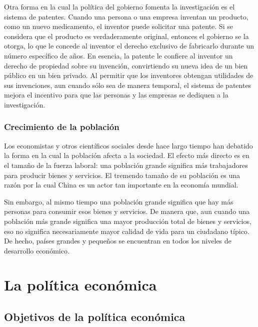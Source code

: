 \documentclass[
]{krantz}
\begin{document}
Otra forma en la cual la política del gobierno fomenta la investigación es el sistema de patentes. Cuando una persona o una empresa inventan un producto, como un nuevo medicamento, el inventor puede solicitar una patente. Si se considera que el producto es verdaderamente original, entonces el gobierno se la otorga, lo que le concede al inventor el derecho exclusivo de fabricarlo durante un número específico de años. En esencia, la patente le confiere al inventor un derecho de propiedad sobre su invención, convirtiendo su nueva idea de un bien público en un bien privado. Al permitir que los inventores obtengan utilidades de sus invenciones, aun cuando sólo sea de manera temporal, el sistema de patentes mejora el incentivo para que las personas y las empresas se dediquen a la investigación.

\hypertarget{crecimiento-de-la-poblaciuxf3n}{%
\subsection{Crecimiento de la población}\label{crecimiento-de-la-poblaciuxf3n}}

Los economistas y otros científicos sociales desde hace largo tiempo han debatido la forma en la cual la población afecta a la sociedad. El efecto más directo es en el tamaño de la fuerza laboral: una población grande significa más trabajadores para producir bienes y servicios. El tremendo tamaño de su población es una razón por la cual China es un actor tan importante en la economía mundial.

Sin embargo, al mismo tiempo una población grande significa que hay más personas para consumir esos bienes y servicios. De manera que, aun cuando una población más grande significa una mayor producción total de bienes y servicios, eso no significa necesariamente mayor calidad de vida para un ciudadano típico. De hecho, países grandes y pequeños se encuentran en todos los niveles de desarrollo económico.

\hypertarget{la-poluxedtica-econuxf3mica}{%
\chapter{La política económica}\label{la-poluxedtica-econuxf3mica}}

\hypertarget{objetivos-de-la-poluxedtica-econuxf3mica}{%
\section{Objetivos de la política económica}\label{objetivos-de-la-poluxedtica-econuxf3mica}}
\end{document}
